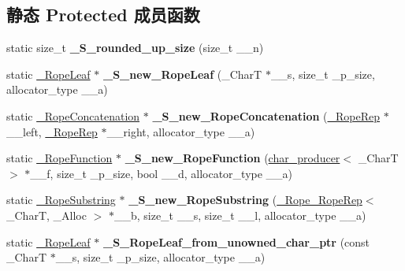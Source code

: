 \subsection*{静态 Protected 成员函数}
\begin{DoxyCompactItemize}
\item 
\mbox{\label{classrope_a9aa45556c2095d2ded9f3537e97b0581}} 
static size\+\_\+t {\bfseries \+\_\+\+S\+\_\+rounded\+\_\+up\+\_\+size} (size\+\_\+t \+\_\+\+\_\+n)
\item 
\mbox{\label{classrope_aee0b27fbbec9f529443f531b123bbd0a}} 
static \hyperlink{struct___rope___rope_leaf}{\+\_\+\+Rope\+Leaf} $\ast$ {\bfseries \+\_\+\+S\+\_\+new\+\_\+\+Rope\+Leaf} (\+\_\+\+CharT $\ast$\+\_\+\+\_\+s, size\+\_\+t \+\_\+p\+\_\+size, allocator\+\_\+type \+\_\+\+\_\+a)
\item 
\mbox{\label{classrope_a8e7135acbd3f8109f872b528113ce150}} 
static \hyperlink{struct___rope___rope_concatenation}{\+\_\+\+Rope\+Concatenation} $\ast$ {\bfseries \+\_\+\+S\+\_\+new\+\_\+\+Rope\+Concatenation} (\hyperlink{struct___rope___rope_rep}{\+\_\+\+Rope\+Rep} $\ast$\+\_\+\+\_\+left, \hyperlink{struct___rope___rope_rep}{\+\_\+\+Rope\+Rep} $\ast$\+\_\+\+\_\+right, allocator\+\_\+type \+\_\+\+\_\+a)
\item 
\mbox{\label{classrope_a69f88a4f32291b95f53a51946bcaff37}} 
static \hyperlink{struct___rope___rope_function}{\+\_\+\+Rope\+Function} $\ast$ {\bfseries \+\_\+\+S\+\_\+new\+\_\+\+Rope\+Function} (\hyperlink{classchar__producer}{char\+\_\+producer}$<$ \+\_\+\+CharT $>$ $\ast$\+\_\+\+\_\+f, size\+\_\+t \+\_\+p\+\_\+size, bool \+\_\+\+\_\+d, allocator\+\_\+type \+\_\+\+\_\+a)
\item 
\mbox{\label{classrope_a2e5c2be5a92606307d77e1fa7c5d6e06}} 
static \hyperlink{struct___rope___rope_substring}{\+\_\+\+Rope\+Substring} $\ast$ {\bfseries \+\_\+\+S\+\_\+new\+\_\+\+Rope\+Substring} (\hyperlink{struct___rope___rope_rep}{\+\_\+\+Rope\+\_\+\+Rope\+Rep}$<$ \+\_\+\+CharT, \+\_\+\+Alloc $>$ $\ast$\+\_\+\+\_\+b, size\+\_\+t \+\_\+\+\_\+s, size\+\_\+t \+\_\+\+\_\+l, allocator\+\_\+type \+\_\+\+\_\+a)
\item 
\mbox{\label{classrope_a22f00b8e26a4ac3565ae0b6957c30724}} 
static \hyperlink{struct___rope___rope_leaf}{\+\_\+\+Rope\+Leaf} $\ast$ {\bfseries \+\_\+\+S\+\_\+\+Rope\+Leaf\+\_\+from\+\_\+unowned\+\_\+char\+\_\+ptr} (const \+\_\+\+CharT $\ast$\+\_\+\+\_\+s, size\+\_\+t \+\_\+p\+\_\+size, allocator\+\_\+type \+\_\+\+\_\+a)

\end{DoxyCompactItemize}
